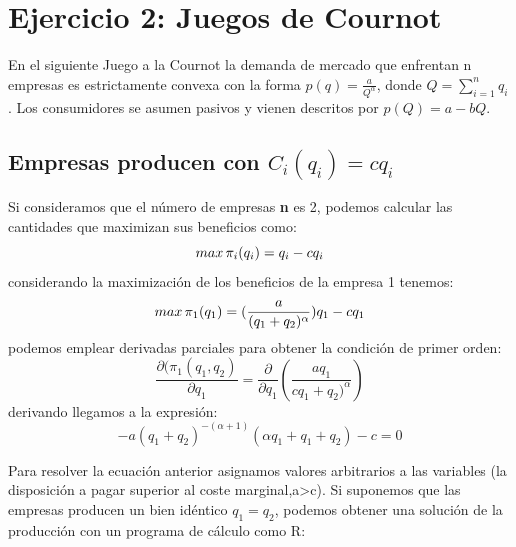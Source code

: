 \documentclass{article}
\begin{document}
\section{Ejercicio 2: Juegos de Cournot}

En el siguiente Juego a la Cournot la demanda de mercado que enfrentan n empresas es estrictamente convexa con la forma
$p(q)=\frac{a}{Q^\alpha}$, donde $Q=\sum_{i=1}^n q_i$. Los consumidores se asumen pasivos y vienen descritos por $p(Q)=a-bQ$.

\subsection{Empresas producen con $C_i(q_i)=cq_i$}
Si consideramos que el n\'umero de empresas \textbf{n} es 2, podemos calcular las cantidades que maximizan sus beneficios como:
 $$max\thinspace \pi_i(q_i)=q_i-cq_i$$
 considerando la maximizaci\'on de los beneficios de la empresa 1 tenemos:
 $$max\thinspace \pi_1(q_1)=(\frac{a}{(q_1+q_2)^\alpha})q_1-cq_1$$
podemos emplear derivadas parciales para obtener la condici\'on de primer orden:
  $$\frac{\partial(\pi_1(q_1,q_2)}{\partial q_1} = \frac{\partial}{\partial q_1} (\frac{aq_1}{cq_1+q_2)^\alpha})$$
  derivando llegamos a la expresi\'on:
  $$-a(q_1+q_2)^{-(\alpha+1)}(\alpha q_1+q_1+q_2)-c=0$$
  
Para resolver la ecuación anterior asignamos valores arbitrarios a las variables (la disposici\'on a pagar superior al coste marginal,a>c). Si suponemos que las empresas producen un bien id\'entico $q_1=q_2$, podemos obtener una solución de la producci\'on con un programa de c\'alculo como R:
\end{document}

